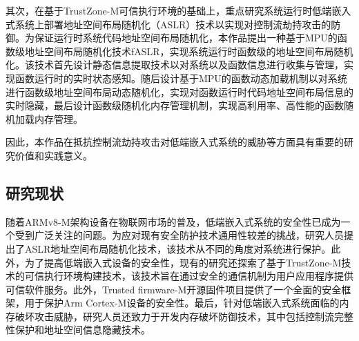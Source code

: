 \documentclass[12pt,a4paper]{ctexart}
\numberwithin{figure}{section}
\begin{document}
\par 其次，在基于TrustZone-M可信执行环境的基础上，重点研究系统运行时低端嵌入式系统上部署地址空间布局随机化（ASLR）技术以实现对控制流劫持攻击的防御。为保证运行时系统代码地址空间布局随机化，本作品提出一种基于MPU的函数级地址空间布局随机化技术fASLR，实现系统运行时函数级的地址空间布局随机化。该技术首先设计静态信息提取技术以对系统以及函数信息进行收集与管理，实现函数运行时的实时状态感知。随后设计基于MPU的函数动态加载机制以对系统进行函数级地址空间布局动态随机化，实现对函数运行时代码地址空间布局信息的实时隐藏，最后设计函数级随机化内存管理机制，实现高利用率、高性能的函数随机加载内存管理。
\par 因此，本作品在抵抗控制流劫持攻击对低端嵌入式系统的威胁等方面具有重要的研究价值和实践意义。






\subsection{研究现状}
\par 随着ARMv8-M架构设备在物联网市场的普及，低端嵌入式系统的安全性已成为一个受到广泛关注的问题。为应对现有安全防护技术通用性较差的挑战，研究人员提出了ASLR地址空间布局随机化技术，该技术从不同的角度对系统进行保护。此外，为了提高低端嵌入式设备的安全性，现有的研究还探索了基于TrustZone-M技术的可信执行环境构建技术，该技术旨在通过安全的通信机制为用户应用程序提供可信软件服务。此外，Trusted firmware-M开源固件项目提供了一个全面的安全框架，用于保护Arm Cortex-M设备的安全性。最后，针对低端嵌入式系统面临的内存破坏攻击威胁，研究人员还致力于开发内存破坏防御技术，其中包括控制流完整性保护和地址空间信息隐藏技术。
\end{document}
